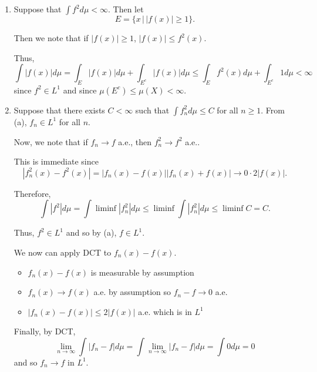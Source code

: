 \documentclass[12pt]{Homework}
\begin{document}
\begin{solution}$\,$
\begin{enumerate}[label=(\alph*)]
    \item Suppose that $\int f^2d\mu<\infty$. Then let $$E=\{x\,|\,|f(x)|\ge1\}.$$
    
    Then we note that if $|f(x)|\ge 1$, $|f(x)|\le f^2(x)$.
    
    Thus, $$\int |f(x)|d\mu=\int_E |f(x)|d\mu+\int_{E^c}|f(x)|d\mu\le\int_Ef^2(x)d\mu+\int_{E^c}1d\mu<\infty$$ since $f^2\in L^1$ and since $\mu(E^c)\le\mu(X)<\infty.$
    \item Suppose that there exists $C<\infty$ such that $\int f_n^2d\mu\le C$ for all $n\ge1$. From (a), $f_n\in L^1$ for all $n$. 
    
    Now, we note that if $f_n\to f$ a.e., then $f_n^2\to f^2$ a.e..
    
    This is immediate since $$|f_n^2(x)-f^2(x)|=|f_n(x)-f(x)||f_n(x)+f(x)|\to0\cdot 2|f(x)|.$$
    
    Therefore, $$\int|f^2|d\mu=\int\liminf|f_n^2|d\mu\le\liminf\int|f_n^2|d\mu\le\liminf C=C.$$
    
    Thus, $f^2\in L^1$ and so by (a), $f\in L^1.$
    
    We now can apply DCT to $f_n(x)-f(x).$
    
    \begin{itemize}
        \item $f_n(x)-f(x)$ is measurable by assumption
        \item $f_n(x)\to f(x)$ a.e. by assumption so $f_n-f\to0$ a.e.
        \item $|f_n(x)-f(x)|\le 2|f(x)|$ a.e. which is in $L^1$
    \end{itemize}
    
    Finally, by DCT, $$\lim_{n\to\infty}\int|f_n-f|d\mu=\int\lim_{n\to\infty}|f_n-f|d\mu=\int0d\mu=0$$ and so $f_n\to f$ in $L^1.$
    
    \begin{comment}
    Now, let $\varepsilon>0$. By Egoroff, (since $\mu$ is a finite measure) there exists a set $A\subset X$ such that $\mu(X\backslash A)<\varepsilon$ and $f_n\to f$ uniformly on $A$.
    
    Thus, for all $x\in A$, there exists an $N$ such that $|f_n(x)-f(x)|<\varepsilon$ for all $n\ge N$.
    
    Therefore, \begin{align*}
        \int|f_n-f|d\mu&=\int_{X\backslash A}|f_n-f|d\mu+\int_A|f_n-f|d\mu\\
        &\le \int_{X\backslash A}|f_n-f|d\mu+\varepsilon\mu(A)\\
        &
    \end{align*}
    

\end{comment}
\end{enumerate}
\end{solution}
\end{document}
